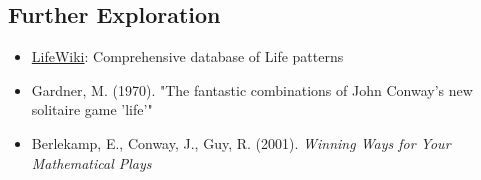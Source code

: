 \documentclass{article}
\begin{document}
\subsection{Further Exploration}

\begin{itemize}
\item \href{http://www.conwaylife.com/wiki/}{LifeWiki}: Comprehensive database of Life patterns
\item Gardner, M. (1970). "The fantastic combinations of John Conway's new solitaire game 'life'"
\item Berlekamp, E., Conway, J., Guy, R. (2001). \emph{Winning Ways for Your Mathematical Plays}
\end{itemize}
\end{document}
